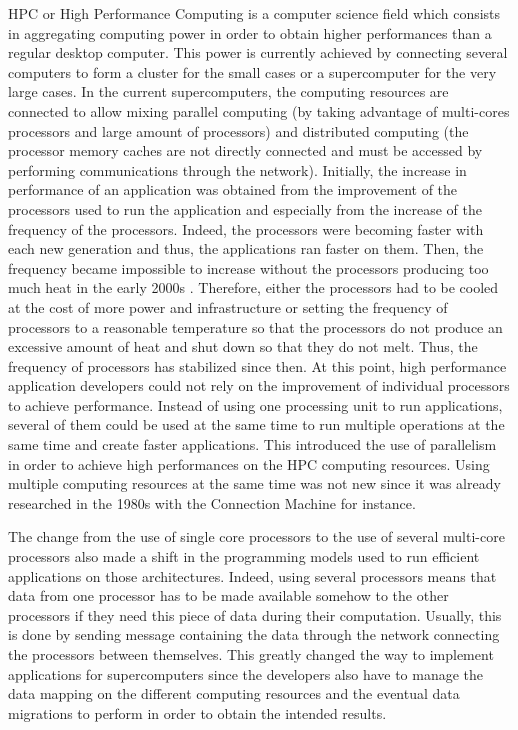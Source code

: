 HPC or High Performance Computing is a computer science field which consists in aggregating computing power in order to obtain higher performances than a regular desktop computer.
This power is currently achieved by connecting several computers to form a cluster for the small cases or a supercomputer for the very large cases.
In the current supercomputers, the computing resources are connected to allow mixing parallel computing (by taking advantage of multi-cores processors and large amount of processors) and distributed computing (the processor memory caches are not directly connected and must be accessed by performing communications through the network).
Initially, the increase in performance of an application was obtained from the improvement of the processors used to run the application and especially from the increase of the frequency of the processors.
Indeed, the processors were becoming faster with each new generation and thus, the applications ran faster on them.
Then, the frequency became impossible to increase without the processors producing too much heat in the early 2000s \cite{KirkH2010}.
Therefore, either the processors had to be cooled at the cost of more power and infrastructure or setting the frequency of processors to a reasonable temperature so that the processors do not produce an excessive amount of heat and shut down so that they do not melt.
Thus, the frequency of processors has stabilized since then.
At this point, high performance application developers could not rely on the improvement of individual processors to achieve performance.
Instead of using one processing unit to run applications, several of them could be used at the same time to run multiple operations at the same time and create faster applications.
This introduced the use of parallelism in order to achieve high performances on the HPC computing resources.
Using multiple computing resources at the same time was not new since it was already researched in the 1980s with the Connection Machine \cite{Hilli1989phd} for instance.

The change from the use of single core processors to the use of several multi-core processors also made a shift in the programming models used to run efficient applications on those architectures.
Indeed, using several processors means that data from one processor has to be made available somehow to the other processors if they need this piece of data during their computation.
Usually, this is done by sending message containing the data through the network connecting the processors between themselves.
This greatly changed the way to implement applications for supercomputers since the developers also have to manage the data mapping on the different computing resources and the eventual data migrations to perform in order to obtain the intended results.

